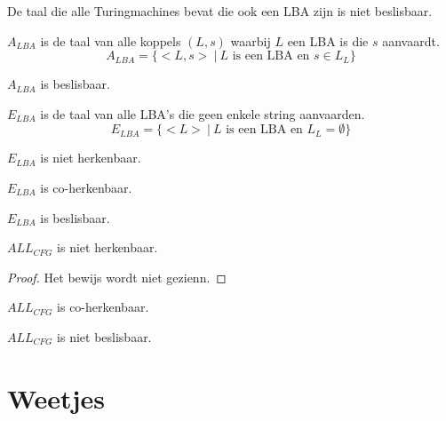 \documentclass[main.tex]{subfiles}
\begin{document}
\begin{st}
  De taal die alle Turingmachines bevat die ook een LBA zijn is niet beslisbaar.
\end{st}

\begin{de}
  \label{de:a-lba}
  $A_{LBA}$ is de taal van alle koppels $(L,s)$ waarbij $L$ een LBA is die $s$ aanvaardt.
  \[ A_{LBA} = \{ <L,s> \ |\ L \text{ is een LBA en } s \in L_{L}\} \]
\end{de}

\begin{st}
  $A_{LBA}$ is beslisbaar.
\end{st}

\begin{de}
  \label{de:e-lba}
  $E_{LBA}$ is de taal van alle LBA's die geen enkele string aanvaarden.
  \[ E_{LBA} = \{ <L> \ |\ L \text{ is een LBA en } L_{L} = \emptyset \} \]
\end{de}

\begin{st}
  $E_{LBA}$ is niet herkenbaar.
\end{st}

\begin{st}
  $E_{LBA}$ is co-herkenbaar.
\end{st}

\begin{gev}
  $E_{LBA}$ is beslisbaar.
\end{gev}


\begin{st}
  $ALL_{CFG}$ is niet herkenbaar.
  \begin{proof}
    Het bewijs wordt niet gezienn.
  \end{proof}
\end{st}

\begin{st}
  $ALL_{CFG}$ is co-herkenbaar.
\end{st}

\begin{gev}
  $ALL_{CFG}$ is niet beslisbaar.
\end{gev}


\section{Weetjes}
\label{sec:weetjes}
\end{document}
